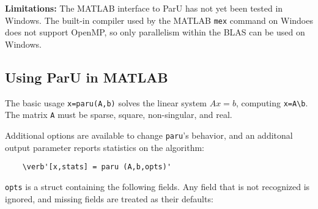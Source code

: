 \documentclass[12pt]{article}
\begin{document}
{\bf Limitations:}
The MATLAB interface to ParU
has not yet been tested in Windows.  %
The built-in compiler used by the MATLAB \verb'mex' command on Windoes does not
support OpenMP, so only parallelism within the BLAS can be used on Windows.

\subsection{Using ParU in MATLAB}

The basic usage \verb'x=paru(A,b)' solves the linear system $Ax=b$, computing
\verb'x=A\b'.  The matrix \verb'A' must be sparse, square, non-singular, and
real.

Additional options are available to change \verb'paru''s behavior, and
an additonal output parameter reports statistics on the algorithm:

    \begin{verbatim}
    \verb'[x,stats] = paru (A,b,opts)'
    \end{verbatim}

\verb'opts' is a struct containing the following fields.  Any field that is not
recognized is ignored, and missing fields are treated as their defaults:
\end{document}
